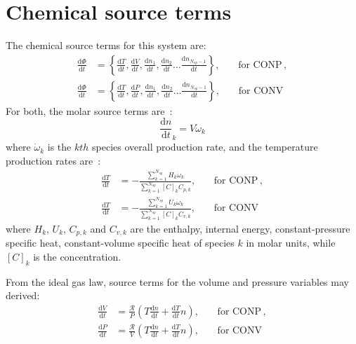 \documentclass[12pt]{article}
\newcommand{\ns}{\ensuremath{{N_{sp}}}}
\newcommand{\conp}{CONP}
\newcommand{\conv}{CONV}
\newcommand{\dconp}{\ensuremath{,\qquad\text{for \conp}}}
\newcommand{\dconv}{\ensuremath{,\qquad\text{for \conv}}}
\newcommand{\Ru}{\ensuremath{\mathcal{R}}}
\begin{document}
\section{Chemical source terms}
The chemical source terms for this system are:
\begin{subequations}
\begin{align}
\frac{\text{d} \Phi }{\text{d} t } &= \left\{\frac{\text{d} T }{\text{d} t },\frac{\text{d} V }{\text{d} t },\frac{\text{d} n_1}{\text{d} t },\frac{\text{d} n_2 }{\text{d} t }\ldots \frac{\text{d} n_{\ns - 1} }{\text{d} t }\right\}\dconp, \\
\frac{\text{d} \Phi }{\text{d} t } &= \left\{\frac{\text{d} T }{\text{d} t },\frac{\text{d} P }{\text{d} t },\frac{\text{d} n_1}{\text{d} t },\frac{\text{d} n_2 }{\text{d} t }\ldots \frac{\text{d} n_{\ns - 1} }{\text{d} t }\right\}\dconv 
\end{align}
\end{subequations}
For both, the molar source terms are~\cite{TurnsStephenR2012Aitc}:
\begin{equation}
\frac{\text{d} n }{\text{d} t }_{k} = V \dot{\omega}_{k}
\label{source:spec}
\end{equation}
where $\dot{\omega}_k$ is the $kth$ species overall production rate, and the temperature production rates are~\cite{TurnsStephenR2012Aitc}:
\begin{subequations}
\label{source:temperature_incomplete}
\begin{align}
\frac{\text{d} T }{\text{d} t } &= - \frac{\sum_{k=1}^{\ns} H_{k} \dot{\omega}_{k}}{\sum_{k=1}^{\ns} [C]_{k} {C_{p, k}}}\dconp, \\
\frac{\text{d} T }{\text{d} t } &= - \frac{\sum_{k=1}^{\ns} U_{k} \dot{\omega}_{k}}{\sum_{k=1}^{\ns} [C]_{k} {C_{v, k}}}\dconv
\end{align}
\end{subequations}
where $H_k$, $U_k$, $C_{p,k}$ and $C_{v, k}$ are the enthalpy, internal energy, constant-pressure specific heat, constant-volume specific heat of species $k$ in molar units, while $[C]_{k}$ is the concentration.

From the ideal gas law, source terms for the volume and pressure variables may derived:
\begin{subequations}
\label{source:param_incomplete}
\begin{align}
\frac{\text{d} V }{\text{d} t } &= \frac{\Ru}{P} \left(T \frac{\text{d} n }{\text{d} t } + \frac{\text{d} T }{\text{d} t } n\right)\dconp, \\
\frac{\text{d} P }{\text{d} t } &= \frac{\Ru}{V} \left(T \frac{\text{d} n }{\text{d} t } + \frac{\text{d} T }{\text{d} t } n\right)\dconv
\end{align}
\end{subequations}
\end{document}
